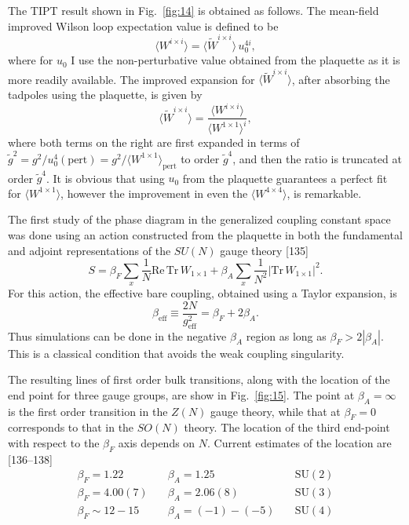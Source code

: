 The TIPT result shown in Fig.~\ref{fig:14} is obtained as follows. The mean-field improved Wilson loop expectation value is defined to be
\begin{equation}
\langle W^{i \times i}\rangle = \langle \tilde{W}^{i \times i}\rangle\, u_0^{4i},
\end{equation}
where for $u_0$ I use the non-perturbative value obtained from the plaquette as it is more readily available. The improved expansion for $\langle \tilde{W}^{i \times i}\rangle$, after absorbing the tadpoles using the plaquette, is given by
\begin{equation}
\langle \tilde{W}^{i \times i}\rangle = \frac{\langle W^{i \times i}\rangle}{\langle W^{1 \times 1}\rangle^i},
\end{equation}
where both terms on the right are first expanded in terms of $\tilde{g}^2 = g^2/u_0^4(\mathrm{pert}) = g^2/\langle W^{1 \times 1}\rangle_{\mathrm{pert}}$ to order $\tilde{g}^4$, and then the ratio is truncated at order $\tilde{g}^4$. It is obvious that using $u_0$ from the plaquette guarantees a perfect fit for $\langle W^{1 \times 1}\rangle$, however the improvement in even the $\langle W^{4 \times 4}\rangle$, is remarkable.

The first study of the phase diagram in the generalized coupling constant space was done using an action constructed from the plaquette in both the fundamental and adjoint representations of the $SU(N)$ gauge theory [135]
\begin{equation}
S = \beta_F \sum_x \frac{1}{N} \mathrm{Re}\, \mathrm{Tr}\, W_{1 \times 1} + \beta_A \sum_x \frac{1}{N^2} |\mathrm{Tr}\, W_{1 \times 1}|^2 .
\end{equation}
For this action, the effective bare coupling, obtained using a Taylor expansion, is
\begin{equation}
\beta_{\mathrm{eff}} \equiv \frac{2N}{g_{\mathrm{eff}}^2} = \beta_F + 2\beta_A .
\end{equation}
Thus simulations can be done in the negative $\beta_A$ region as long as $\beta_F > 2|\beta_A|$. This is a classical condition that avoids the weak coupling singularity.

The resulting lines of first order bulk transitions, along with the location of the end point for three gauge groups, are show in Fig.~\ref{fig:15}. The point at $\beta_A = \infty$ is the first order transition in the $Z(N)$ gauge theory, while that at $\beta_F = 0$ corresponds to that in the $SO(N)$ theory. The location of the third end-point with respect to the $\beta_F$ axis depends on $N$. Current estimates of the location are [136--138]
\begin{equation}
\begin{array}{lll}
\beta_F = 1.22 & \quad \beta_A = 1.25 & \quad \mathrm{SU}(2) \\
\beta_F = 4.00(7) & \quad \beta_A = 2.06(8) & \quad \mathrm{SU}(3) \\
\beta_F \sim 12{-}15 & \quad \beta_A = (-1) - (-5) & \quad \mathrm{SU}(4)
\end{array}
\end{equation}


